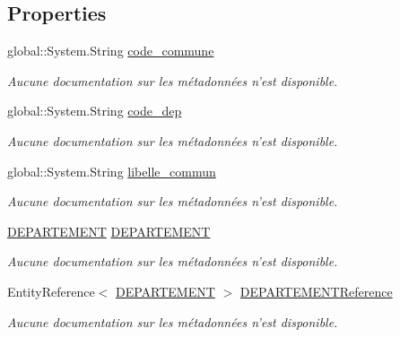 \subsection*{Properties}
\begin{DoxyCompactItemize}
\item 
global\-::\-System.\-String \hyperlink{class_model_1_1_c_o_m_m_u_n_e_aee3168256be0d999cdc2a6db66875cf9}{code\-\_\-commune}
\begin{DoxyCompactList}\small\item\em Aucune documentation sur les métadonnées n'est disponible. \end{DoxyCompactList}\item 
global\-::\-System.\-String \hyperlink{class_model_1_1_c_o_m_m_u_n_e_a0c96be96f831dddcb05051cf3513986b}{code\-\_\-dep}
\begin{DoxyCompactList}\small\item\em Aucune documentation sur les métadonnées n'est disponible. \end{DoxyCompactList}\item 
global\-::\-System.\-String \hyperlink{class_model_1_1_c_o_m_m_u_n_e_a7e5b6345cd53c93bc68aadbf0846038d}{libelle\-\_\-commun}
\begin{DoxyCompactList}\small\item\em Aucune documentation sur les métadonnées n'est disponible. \end{DoxyCompactList}\item 
\hyperlink{class_model_1_1_d_e_p_a_r_t_e_m_e_n_t}{D\-E\-P\-A\-R\-T\-E\-M\-E\-N\-T} \hyperlink{class_model_1_1_c_o_m_m_u_n_e_a0b2beac6a64f8fa9413209ff4dae52f6}{D\-E\-P\-A\-R\-T\-E\-M\-E\-N\-T}
\begin{DoxyCompactList}\small\item\em Aucune documentation sur les métadonnées n'est disponible. \end{DoxyCompactList}\item 
Entity\-Reference$<$ \hyperlink{class_model_1_1_d_e_p_a_r_t_e_m_e_n_t}{D\-E\-P\-A\-R\-T\-E\-M\-E\-N\-T} $>$ \hyperlink{class_model_1_1_c_o_m_m_u_n_e_a6561fcb5ec3bd228f22d5169b60ee1ba}{D\-E\-P\-A\-R\-T\-E\-M\-E\-N\-T\-Reference}
\begin{DoxyCompactList}\small\item\em Aucune documentation sur les métadonnées n'est disponible. \end{DoxyCompactList}\end{DoxyCompactItemize}


